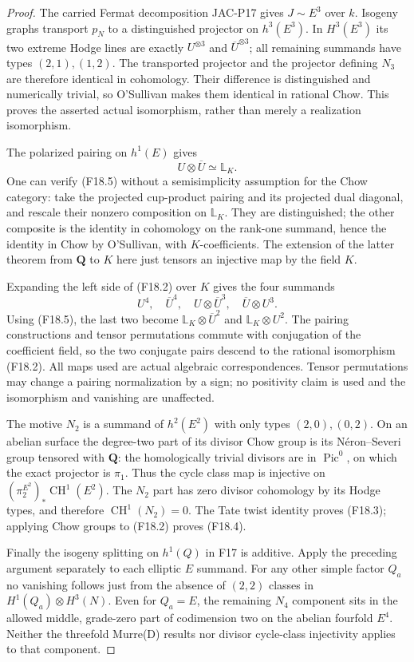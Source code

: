 \documentclass[11pt]{article}
\theoremstyle{remark}\newtheorem{remark}[theorem]{Remark}
\begin{document}
\begin{proof}
The carried Fermat decomposition JAC-P17 gives $J\sim E^3$
over $k$.  Isogeny graphs transport $p_N$ to a distinguished
projector on $h^3(E^3)$.  In $H^3(E^3)$ its two extreme Hodge
lines are exactly $U^{\otimes3}$ and $\overline U^{\otimes3}$;
all remaining summands have types $(2,1),(1,2)$.
The transported projector and the projector defining $N_3$
are therefore identical in cohomology.  Their difference is
distinguished and numerically trivial, so O'Sullivan makes
them identical in rational Chow.  This proves the asserted
actual isomorphism, rather than merely a realization isomorphism.

The polarized pairing on $h^1(E)$ gives
\[
                         U\otimes\overline U\simeq\mathbb L_K.
 \tag{F18.5}
\]
One can verify (F18.5) without a semisimplicity assumption for
the Chow category: take the projected cup-product pairing and
its projected dual diagonal, and rescale their nonzero
composition on $\mathbb L_K$.  They are distinguished; the
other composite is the identity in cohomology on the rank-one
summand, hence the identity in Chow by O'Sullivan, with
$K$-coefficients.  The extension of the latter theorem from
$\mathbf Q$ to $K$ here just tensors an injective map by the
field $K$.

Expanding the left side of (F18.2) over $K$ gives the four
summands
\[
 U^4,\quad\overline U^4,\quad
 U\otimes\overline U^3,\quad
 \overline U\otimes U^3.
 \tag{F18.6}
\]
Using (F18.5), the last two become
$\mathbb L_K\otimes\overline U^2$ and
$\mathbb L_K\otimes U^2$.  The pairing constructions and
tensor permutations commute with conjugation of the coefficient
field, so the two conjugate pairs descend to the rational
isomorphism (F18.2).  All maps used are actual algebraic
correspondences.  Tensor permutations may change a pairing
normalization by a sign; no positivity claim is used and the
isomorphism and vanishing are unaffected.

The motive $N_2$ is a summand of $h^2(E^2)$ with only
types $(2,0),(0,2)$.  On an abelian surface the degree-two
part of its divisor Chow group is its N\'eron--Severi group
tensored with $\mathbf Q$: the homologically trivial divisors
are in $\operatorname{Pic}^0$, on which the exact projector
is $\pi_1$.  Thus the cycle class map is injective on
$(\pi_2^{E^2})_*\operatorname{CH}^1(E^2)$.
The $N_2$ part has zero divisor cohomology by its Hodge types,
and therefore $\operatorname{CH}^1(N_2)=0$.
The Tate twist identity proves (F18.3); applying Chow groups
to (F18.2) proves (F18.4).

Finally the isogeny splitting on $h^1(Q)$ in F17 is additive.
Apply the preceding argument separately to each elliptic
$E$ summand.  For any other simple factor $Q_a$ no vanishing
follows just from the absence of $(2,2)$ classes in
$H^1(Q_a)\otimes H^3(N)$.  Even for $Q_a=E$, the remaining
$N_4$ component sits in the allowed middle, grade-zero part
of codimension two on the abelian fourfold $E^4$.
Neither the threefold Murre(D) results nor divisor
cycle-class injectivity applies to that component.
\end{proof}
\end{document}
